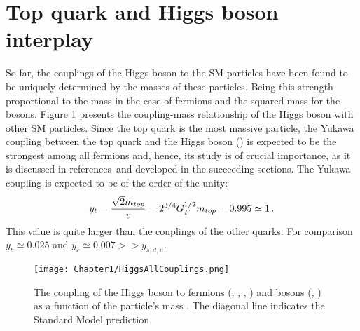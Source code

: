 \section{Top quark and Higgs boson interplay}
\label{sec:Chap1:top-Higgs}

So far, the couplings of the Higgs boson to the SM particles have been found to be 
uniquely determined by the masses of these particles. Being this strength proportional
to the mass in the case of fermions and the squared mass for the bosons. 
Figure \ref{fig:Chap2:HiggsAllCouplings} presents 
the coupling-mass relationship of the Higgs boson with other SM particles.
Since the top quark is the most massive particle, 
the Yukawa coupling between the top quark and the Higgs boson (\yt) is expected 
to be the strongest among all fermions and, hence, its
study is of crucial importance, as it is discussed in references\,\cite{Farina:2012xp}\cite{Biswas:2012bd} 
and developed in the succeeding sections. The Yukawa coupling is expected to be of the order of the unity:
\begin{equation*}
	y_{t} = \frac{\sqrt{2}m_{top}}{v} = 2^{3/4}G_{F}^{1/2}m_{top} = 0.995 \simeq 1 \, .
\end{equation*}
This value is quite larger than the couplings of the other quarks. For comparison
$y_b \simeq 0.025$ and $y_c \simeq 0.007 >> y_{s,d,u}$.  

\begin{figure}
    \centering
    \texttt{[image: Chapter1/HiggsAllCouplings.png]}
    \caption{The coupling of the Higgs boson to fermions (\Pmu, \Ptau, \Pbottom, \Ptop) 
    		and bosons (\PW, \PZ) as a function of the particle’s mass \cite{Collaboration:2045852}. 
		The diagonal line indicates the Standard Model prediction.}
    \label{fig:Chap2:HiggsAllCouplings}
\end{figure}




